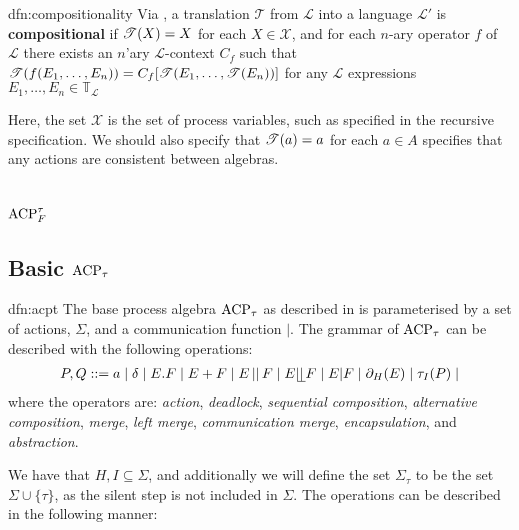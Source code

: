 \documentclass[../hons_project.tex]{subfiles}
\begin{document}
\begin{dfn}[Compositionality]{dfn:compositionality}{}
   Via \cite{DBLP:conf/fossacs/Glabbeek18}, a translation $\mathscr{T}$ from $\mathscr{L}$ into a language $\mathscr{L}'$ is \textbf{compositional} if $\mathscr{T}(X) = X$ for each $X\in \mathscr{X}$, and for each $n$-ary operator $f$ of $\mathscr{L}$ there exists an $n$'ary $\mathscr{L}$-context $C_{f}$ such that $\mathscr{T}(f(E_{1},\dots,E_{n})) = C_{f}[\mathscr{T}(E_{1},\dots,\mathscr{T}(E_{n}))]$ for any $\mathscr{L}$ expressions $E_{1},\dots,E_{n}\in \mathbb{T}_{\mathscr{L}}$
\end{dfn}

Here, the set $\mathscr{X}$ is the set of process variables, such as specified in the recursive specification. We should also specify that $\mathscr{T}(a) = a$ for each $a\in A$ specifies that any actions are consistent between algebras.

\section{\texorpdfstring{$\mathrm{ACP}_{F}^{\tau}$}{ACP-tf}}\label{sc:acp}

\subsection{Basic \texorpdfstring{$\mathrm{ACP}_{\tau}$}{acpt}}
\begin{dfn}{dfn:acpt}{}
   The base process algebra $\mathrm{ACP}_{\tau}$ as described in \cite{bergstraACPtUniversalAxiom1989} is parameterised by a set of actions, $\Sigma$, and a communication function $|$. The grammar of $\mathrm{ACP}_{\tau}$ can be described with the following operations:
   \begin{align*}
      P, Q ::= a \mid \delta \mid E . F \mid E + F \mid E \merge F \mid E \leftmerge F \mid E | F \mid \restrict(E) \mid \tau_{I}(P) \mid
   \end{align*}
   where the operators are: \textit{action}, \textit{deadlock}, \textit{sequential composition}, \textit{alternative composition},  \textit{merge}, \textit{left merge}, \textit{communication merge}, \textit{encapsulation}, and \textit{abstraction}.
\end{dfn}
We have that $H, I \subseteq \Sigma$, and additionally we will define the set $\Sigma_{\tau}$ to be the set $\Sigma \cup \{\tau\}$, as the silent step is not included in $\Sigma$. The operations can be described in the following manner:
\end{document}
